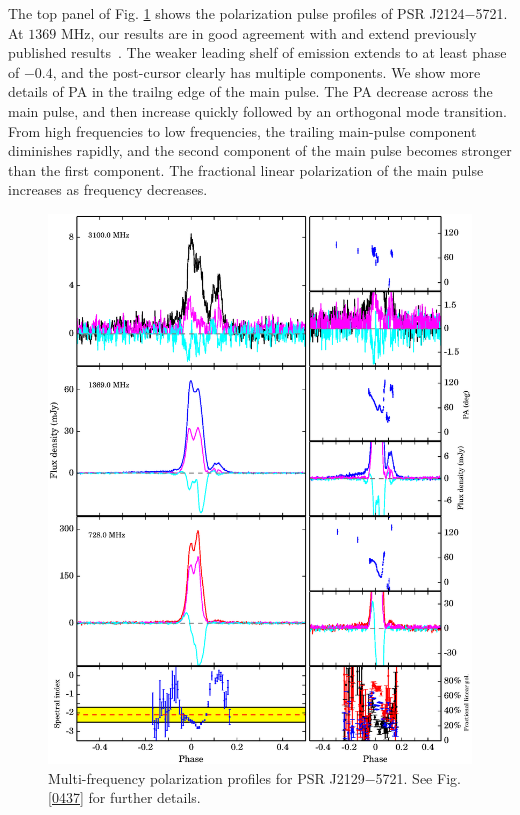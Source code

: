 \documentclass[useAMS,usenatbib]{mn2e}
\begin{document}
The top panel of Fig. \ref{2129} shows the polarization pulse profiles of 
PSR J2124$-$5721.
%
At $1369$ MHz, our results are in good agreement with and extend previously 
published results~\citep{Yan11}.
%
The weaker leading shelf of emission extends to at least phase of $-0.4$, and 
the post-cursor clearly has multiple components.
%
We show more details of PA in the trailng edge of the main pulse.  
%
The PA decrease across the main pulse, and then increase quickly followed 
by an orthogonal mode transition.
%
From high frequencies to low frequencies, the trailing main-pulse component 
diminishes rapidly, and the second component of the main pulse becomes stronger
than the first component.
%
The fractional linear polarization of the main pulse increases as frequency 
decreases.


\begin{figure}
\begin{center}
\includegraphics[width=6 in]{2129.ps}
\caption{Multi-frequency polarization profiles for PSR J2129$-$5721. 
See Fig. \ref{0437} for further details.}
\label{2129}
\end{center}
\end{figure}
\end{document}
